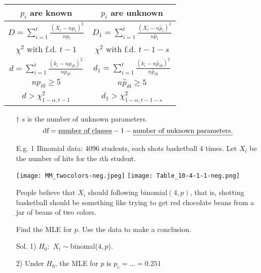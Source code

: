 \begin{frame}
\begin{center}
\renewcommand{\arraystretch}{2}
\begin{tabular}{c|c}
	$p_i$ are known \cellcolor{gray!50!background}                  & $p_i$ are unknown \cellcolor{gray!50!background}                           \\ \hline
	$D=\sum_{i=1}^t  \frac{\left(X_i-np_i \right)^2}{np_i}$         & $D_1=\sum_{i=1}^t  \frac{\left(X_i-n\hat p_i \right)^2}{n \hat p_i}$       \\
	$\chi^2$ with f.d. $t-1$                                        & $\chi^2$ with f.d. $t-1-s$                                                 \\
	$d=\sum_{i=1}^t  \frac{\left(k_i-n p_{i0} \right)^2}{n p_{i0}}$ & $d_1=\sum_{i=1}^t  \frac{\left(k_i-n\hat p_{i0} \right)^2}{n \hat p_{i0}}$ \\
	$np_{i0}\ge 5$                                                  & $n\hat p_{i0}\ge 5$                                                        \\
	$d>\chi^2_{1-\alpha,t-1}$                                       & $d_1>\chi^2_{1-\alpha,t-1-s}$
\end{tabular}
\end{center}
\vfill
\begin{enumerate}
\item[$\dagger$] $s$ is the number of unknown parameters.\\
\[
\text{df} = \text{\underline{number of classes}} -1 -
\text{\underline{number of unknown parameters.}}
\]
\end{enumerate}
\end{frame}
\begin{frame}
\begin{enumerate}
\item[E.g. 1] Binomial data:
4096 students, each shots basketball $4$ times.
Let $X_i$ be the number of hits for the $i$th student.
\begin{center}
\texttt{[image: MM\_twocolors-neg.jpeg]}	\qquad
\texttt{[image: Table\_10-4-1-1-neg.png]}
\end{center}
\item[] People believe that $X_i$ should following binomial$(4,p)$, that is,
shotting basketball should be something like trying to get red chocolate beans
from a jar of beans of two colors.\\[1em]
\item[] Find the MLE for $p$. Use the data to make a conclusion.
\vfill
\item[Sol.] 1) $H_0:$ $X_i\sim$binomal($4,p$).\\[1em]
\item[] 2) Under $H_0$, the MLE for $p$ is $p_e= ... = 0.251$
\end{enumerate}
\end{frame}
